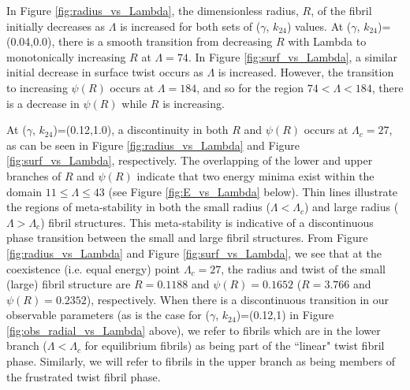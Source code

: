 \documentclass[%
 reprint,
 amsmath,amssymb,
 aps,
]{revtex4-1}
\begin{document}
In Figure \ref{fig:radius_vs_Lambda}, the dimensionless radius, $R$, of the fibril initially decreases as $\Lambda$ is increased for both sets of ($\gamma$, $k_{24}$) values. At ($\gamma$, $k_{24}$)=(0.04,0.0), there is a smooth transition from decreasing $R$ with Lambda to monotonically increasing $R$ at $\Lambda=74$. In Figure \ref{fig:surf_vs_Lambda}, a similar initial decrease in surface twist occurs as $\Lambda$ is increased. However, the transition to increasing $\psi(R)$ occurs at $\Lambda=184$, and so for the region $74<\Lambda<184$, there is a decrease in $\psi(R)$ while $R$ is increasing.

At ($\gamma$, $k_{24}$)=(0.12,1.0), a discontinuity in both $R$ and $\psi(R)$ occurs at $\Lambda_c=27$, as can be seen in Figure \ref{fig:radius_vs_Lambda} and Figure \ref{fig:surf_vs_Lambda}, respectively. The overlapping of the lower and upper branches of $R$ and $\psi(R)$ indicate that two energy minima exist within the domain $11\leq\Lambda\leq43$ (see Figure \ref{fig:E_vs_Lambda} below). Thin lines illustrate the regions of meta-stability in both the small radius ($\Lambda<\Lambda_c$) and large radius ($\Lambda>\Lambda_c$) fibril structures. This meta-stability is indicative of a discontinuous phase transition between the small and large fibril structures. From Figure \ref{fig:radius_vs_Lambda} and Figure \ref{fig:surf_vs_Lambda}, we see that at the coexistence (i.e. equal energy) point $\Lambda_c=27$, the radius and twist of the small (large) fibril structure are $R=0.1188$ and $\psi(R)=0.1652$ ($R=3.766$ and $\psi(R)=0.2352$), respectively. When there is a discontinuous transition in our observable parameters (as is the case for ($\gamma$, $k_{24}$)=(0.12,1) in Figure \ref{fig:obs_radial_vs_Lambda} above), we refer to fibrils which are in the lower branch ($\Lambda<\Lambda_c$ for equilibrium fibrils) as being part of the ``linear" twist fibril phase. Similarly, we will refer to fibrils in the upper branch as being members of the frustrated twist fibril phase. 
\end{document}
